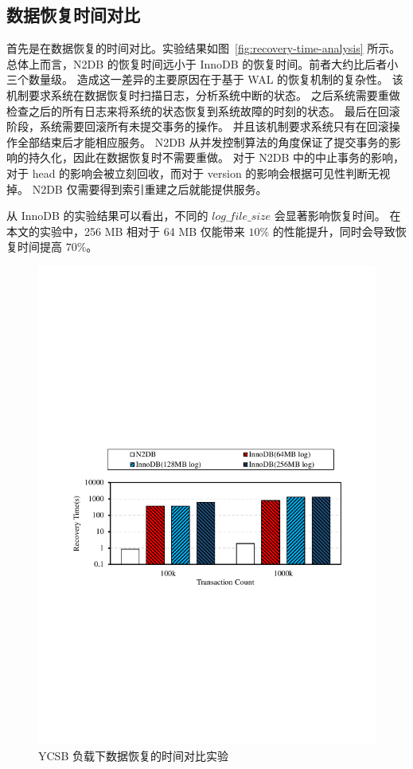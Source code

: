 \subsection{数据恢复时间对比}

首先是在数据恢复的时间对比。实验结果如图~\ref{fig:recovery-time-analysis} 所示。
总体上而言，N2DB 的恢复时间远小于 InnoDB 的恢复时间。前者大约比后者小三个数量级。
造成这一差异的主要原因在于基于 WAL 的恢复机制的复杂性。
该机制要求系统在数据恢复时扫描日志，分析系统中断的状态。
之后系统需要重做检查之后的所有日志来将系统的状态恢复到系统故障的时刻的状态。
最后在回滚阶段，系统需要回滚所有未提交事务的操作。
并且该机制要求系统只有在回滚操作全部结束后才能相应服务。
N2DB 从并发控制算法的角度保证了提交事务的影响的持久化，因此在数据恢复时不需要重做。
对于 N2DB 中的中止事务的影响，对于 head 的影响会被立刻回收，而对于 version 的影响会根据可见性判断无视掉。
N2DB 仅需要得到索引重建之后就能提供服务。

从 InnoDB 的实验结果可以看出，不同的 $log\_file\_size$ 会显著影响恢复时间。
在本文的实验中，256 MB 相对于 64 MB 仅能带来 $10\%$ 的性能提升，同时会导致恢复时间提高 $70\%$。


\begin{figure}
    \centering
    \includegraphics[width=15cm, trim={1cm 9cm 1cm 10cm}]{figures/recovery-time.pdf}
    \caption{YCSB 负载下数据恢复的时间对比实验}
    \label{fig:recovery-time-ycsb}
\end{figure}

